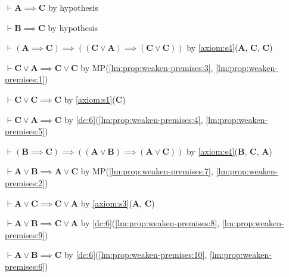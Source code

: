 \documentclass{amsart}%
\newcommand\metavariable[1]{\boldsymbol{#1}}
\begin{document}
\begin{pf}
\item\label{lm:prop:weaken-premises:1} $\vdash\metavariable{A}\implies\metavariable{C}$
  by hypothesis
\item\label{lm:prop:weaken-premises:2} $\vdash\metavariable{B}\implies\metavariable{C}$
  by hypothesis
\item\label{lm:prop:weaken-premises:3} $\vdash(\metavariable{A}\implies\metavariable{C})\implies((\metavariable{C}\lor\metavariable{A})\implies(\metavariable{C}\lor\metavariable{C}))$
  by \ref{axiom:s4}($\metavariable{A}$, $\metavariable{C}$, $\metavariable{C}$)
\item\label{lm:prop:weaken-premises:4}
  $\vdash\metavariable{C}\lor\metavariable{A}\implies\metavariable{C}\lor\metavariable{C}$
  by MP(\ref{lm:prop:weaken-premises:3}, \ref{lm:prop:weaken-premises:1})
\item\label{lm:prop:weaken-premises:5}
  $\vdash\metavariable{C}\lor\metavariable{C}\implies\metavariable{C}$
  by \ref{axiom:s1}($\metavariable{C}$)
\item\label{lm:prop:weaken-premises:6}
  $\vdash\metavariable{C}\lor\metavariable{A}\implies\metavariable{C}$
  by \ref{dc:6}(\ref{lm:prop:weaken-premises:4}, \ref{lm:prop:weaken-premises:5})
\item\label{lm:prop:weaken-premises:7}
  $\vdash(\metavariable{B}\implies\metavariable{C})\implies((\metavariable{A}\lor\metavariable{B})\implies(\metavariable{A}\lor\metavariable{C}))$
  by \ref{axiom:s4}($\metavariable{B}$, $\metavariable{C}$, $\metavariable{A}$)
\item\label{lm:prop:weaken-premises:8}
  $\vdash\metavariable{A}\lor\metavariable{B}\implies\metavariable{A}\lor\metavariable{C}$
  by MP(\ref{lm:prop:weaken-premises:7}, \ref{lm:prop:weaken-premises:2})
\item\label{lm:prop:weaken-premises:9}
  $\vdash\metavariable{A}\lor\metavariable{C}\implies\metavariable{C}\lor\metavariable{A}$
  by \ref{axiom:s3}($\metavariable{A}$, $\metavariable{C}$)
\item\label{lm:prop:weaken-premises:10}
  $\vdash\metavariable{A}\lor\metavariable{B}\implies\metavariable{C}\lor\metavariable{A}$
  by \ref{dc:6}(\ref{lm:prop:weaken-premises:8}, \ref{lm:prop:weaken-premises:9})
\item\label{lm:prop:weaken-premises:11}
  $\vdash\metavariable{A}\lor\metavariable{B}\implies\metavariable{C}$
  by \ref{dc:6}(\ref{lm:prop:weaken-premises:10}, \ref{lm:prop:weaken-premises:6})
\end{pf}
\end{document}
